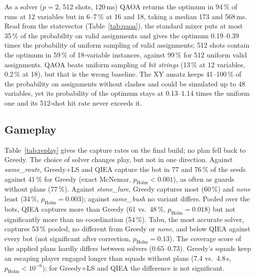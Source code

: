 \documentclass[sigconf]{acmart}
\begin{document}
As a solver ($p=2$, 512 shots, 120\,ms) QAOA returns the optimum in 94\,\% of runs at 12 variables
but in 6--7\,\% at 16 and 18, taking a median 173 and 568\,ms. Read from the statevector
(Table~\ref{tab:qaoa}), the standard mixer puts at most 35\,\% of the probability on valid
assignments and gives the optimum 0.19--0.39 times the probability of uniform sampling of valid
assignments; 512 shots contain the optimum in 59\,\% of 18-variable instances, against 99\,\% for 512
uniform valid assignments. QAOA beats uniform sampling of \emph{bit strings} (13\,\% at 12 variables,
0.2\,\% at 18), but that is the wrong baseline. The XY ansatz keeps 41--100\,\% of the probability on
assignments without clashes and could be simulated up to 48 variables, yet its probability of the
optimum stays at 0.13--1.14 times the uniform one and its 512-shot hit rate never exceeds it.

\subsection{Gameplay}

\begin{table}[t]
\centering\small
\caption{Capture rate (\%) per exploit bot and coordination variant on the final build, 100
paired seeds per cell (Wilson 95\,\% intervals about $\pm10$ points per bot, $\pm6$ pooled).
\emph{none}: no plans, FSM only.}
\label{tab:replay}
\setlength{\tabcolsep}{3pt}

\end{table}

Table~\ref{tab:replay} gives the capture rates on the final build; no plan fell back to Greedy.
The choice of solver changes play, but not in one direction. Against \emph{same\_route},
Greedy+LS and QIEA capture the bot in 77 and 76\,\% of the seeds against 41\,\% for Greedy (exact
McNemar, $p_\text{Holm}<0.001$), as often as guards without plans (77\,\%). Against
\emph{stone\_lure}, Greedy captures most (60\,\%) and \emph{none} least (34\,\%,
$p_\text{Holm}=0.003$); against \emph{same\_bush} no variant differs. Pooled over the bots, QIEA
captures more than Greedy (61 vs.\ 48\,\%, $p_\text{Holm}=0.018$) but not significantly more than
no coordination (54\,\%). Tabu, the most accurate solver, captures 53\,\% pooled, no different from
Greedy or \emph{none}, and below QIEA against every bot (not significant after correction, $p_\text{Holm}=0.13$). The coverage score of the applied plans hardly differs between solvers
(0.65--0.73). Greedy's squads keep an escaping player engaged longer than squads without plans
(7.4 vs.\ 4.8\,s, $p_\text{Holm}<10^{-6}$); for Greedy+LS and QIEA the difference is not significant.
\end{document}

